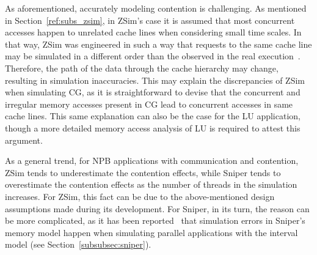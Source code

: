 \documentclass[AMA,final,STIX1COL]{WileyNJD-v2}
\begin{document}

As aforementioned, accurately modeling contention is challenging. 
As mentioned in Section~\ref{ref:subs_zsim}, in ZSim's case it is assumed that most concurrent accesses happen to unrelated cache lines when considering small time scales. 
In that way, ZSim was engineered in such a way that requests to the same cache line may be simulated in a different order than the observed in the real execution~\cite{sanchez2013zsim}.
Therefore, the path of the data through the cache hierarchy may change, resulting in simulation inaccuracies.
This may explain the discrepancies of ZSim when simulating CG, as it is straightforward to devise that the concurrent and irregular memory accesses present in CG lead to concurrent accesses in same cache lines.
This same explanation can also be the case for the LU application, though a more detailed memory access analysis of LU is required to attest this argument.

As a general trend, for NPB applications with communication and contention, ZSim tends to underestimate the contention effects, while Sniper tends to overestimate the contention effects as the number of threads in the simulation increases.
For ZSim, this fact can be due to the above-mentioned design assumptions made during its development. 
For Sniper, in its turn, the reason can be more complicated, as it has been reported~\cite{carlson2014aeohmcm} that simulation errors in Sniper's memory model happen when simulating parallel applications with the interval model (see Section~\ref{subsubsec:sniper}). 


\end{document}
